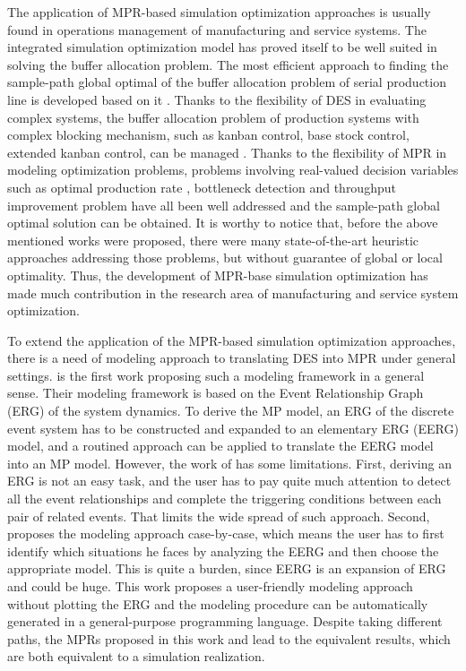 \documentclass[]{interact}
\theoremstyle{plain}%
\theoremstyle{definition}
\theoremstyle{remark}
\begin{document}
The application of MPR-based simulation optimization approaches is usually found in operations management of manufacturing and service systems. The integrated simulation optimization model has proved itself to be well suited in solving the buffer allocation problem. The most efficient approach to finding the sample-path global optimal of the buffer allocation problem of serial production line is developed based on it \citep{zhang2020BAP}. Thanks to the flexibility of DES in evaluating complex systems, the buffer allocation problem of production systems with complex blocking mechanism, such as kanban control, base stock control, extended kanban control, can be managed \citep{pedrielli2015integrated}. Thanks to the flexibility of MPR in modeling optimization problems, problems involving real-valued decision variables such as optimal production rate \citep{tan2015mathematical}, bottleneck detection \citep{zhang2018data} and throughput improvement problem \citep{zhang2020models} have all been well addressed and the sample-path global optimal solution can be obtained. It is worthy to notice that, before the above mentioned works were proposed, there were many state-of-the-art heuristic approaches addressing those problems, but without guarantee of global or local optimality. Thus, the development of MPR-base simulation optimization has made much contribution in the research area of manufacturing and service system optimization.

To extend the application of the MPR-based simulation optimization approaches, there is a need of modeling approach to translating DES into MPR under general settings. \cite{chan2008optimization} is the first work proposing such a modeling framework in a general sense. Their modeling framework is based on the Event Relationship Graph (ERG) of the system dynamics. To derive the MP model, an ERG of the discrete event system has to be constructed and expanded to an elementary ERG (EERG) model, and a routined approach can be applied to translate the EERG model into an MP model. However, the work of \cite{chan2008optimization} has some limitations. First, deriving an ERG is not an easy task, and the user has to pay quite much attention to detect all the event relationships and complete the triggering conditions between each pair of related events. That limits the wide spread of such approach. Second, \cite{chan2008optimization} proposes the modeling approach case-by-case, which means the user has to first identify which situations he faces by analyzing the EERG and then choose the appropriate model. This is quite a burden, since EERG is an expansion of ERG and could be huge. This work proposes a user-friendly modeling approach without plotting the ERG and the modeling procedure can be automatically generated in a general-purpose programming language. Despite taking different paths, the MPRs proposed in this work and \cite{chan2008optimization} lead to the equivalent results, which are both equivalent to a simulation realization.
\end{document}
